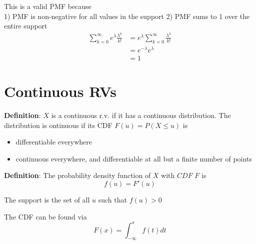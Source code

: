 This is a valid PMF because \\
   1) PMF is non-negative for all values in the support
   2) PMF sums to 1 over the entire support
   \begin{align*}
      \sum_{k = 0}^{\infty} e^{\lambda} \frac{\lambda^k}{k!} &= e^{\lambda } \sum_{k = 0}^{\infty} \frac{\lambda^k}{k!} \\
      &= e^{-\lambda} e^{\lambda} \\
      &= 1
   \end{align*}
  

\section{Continuous RVs}

\begin{framed}
   \textbf{Definition}: $X$ is a continuous r.v. if it has a continuous distribution. The distribution is ontinuous if its CDF $F(u) = P(X \leq u)$ is
   \begin{itemize}
      \item differentiable everywhere
      \item continuous everywhere, and differentiable at all but a finite number of points
   \end{itemize}
\end{framed}

\begin{framed}
   \textbf{Definition}: The probability density function of $X$ with $CDF$ $F$ is
   \[
     f(u) = F'(u)
   \] 

   The support is the set of all $u$ such that $f(u) > 0$ 

   The CDF can be found via
   \[
     F(x) = \int_{-\infty}^{x}  f(t) dt 
   \] 
  
\end{framed}


